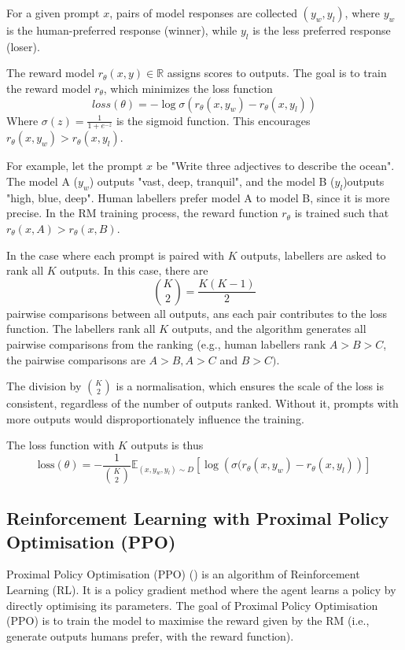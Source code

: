 \documentclass{article} %
\begin{document}
For a given prompt \( x \), pairs of model responses are collected 
\( (y_w, y_l) \), where \( y_w \) is the human-preferred response (winner), while \( y_l \) is the less preferred response (loser).

The reward model \( r_\theta(x, y) \in \mathbb{R} \) assigns scores to outputs. The goal is to train the reward model \(r_\theta\), which minimizes the loss function 
\[
loss(\theta) = -\log\sigma\left(r_\theta(x, y_w) - r_\theta(x, y_l)\right)
\]
Where
\( \sigma(z) = \frac{1}{1+e^{-z}} \) is the sigmoid function. This encourages \( r_\theta(x, y_w) > r_\theta(x, y_l) \).

For example, let the prompt \(x\) be "Write three adjectives to describe the ocean". The model A (\(y_w\)) outputs "vast, deep, tranquil", and the model B (\(y_l\))outputs "high, blue, deep". Human labellers prefer model A to model B, since it is more precise. In the RM training process, the reward function \(r_\theta\) is trained such that \(r_\theta(x, A) > r_\theta(x, B)\).

In the case where each prompt is paired with \(K\) outputs, labellers are asked to rank all \(K\) outputs. In this case, there are \[
\binom{K}{2} = \frac{K(K-1)}{2}
\] pairwise comparisons between all outputs, ans each pair contributes to the loss function. The labellers rank all \( K \) outputs, and the algorithm generates all pairwise comparisons from the ranking (e.g., human labellers rank \(A > B > C\), the pairwise comparisons are \(A > B, A > C\) 
and \(B > C)\). 

The division by \(\binom{K}{2}\) is a normalisation, which ensures the scale of the loss is consistent, regardless of the number of outputs ranked. Without it, prompts with more outputs would disproportionately influence the training. 

The loss function with \(K\) outputs is thus
\[
\text{loss}(\theta) = - \frac{1}{\binom{K}{2}} \mathbb{E}_{(x, y_w, y_l) \sim D} \left[\log \left(\sigma (r_{\theta}(x, y_w) - r_{\theta}(x, y_l)\right)\right]
\]

\subsection{Reinforcement Learning with Proximal Policy Optimisation (PPO)}
Proximal Policy Optimisation (PPO) (\cite{schulman2017ppo}) is an algorithm of Reinforcement Learning (RL). It is a policy gradient method where the agent learns a policy by directly optimising its parameters.
The goal of Proximal Policy Optimisation (PPO) is to train the model to maximise the reward given by the RM (i.e., generate outputs humans prefer, with the reward function).
\end{document}

